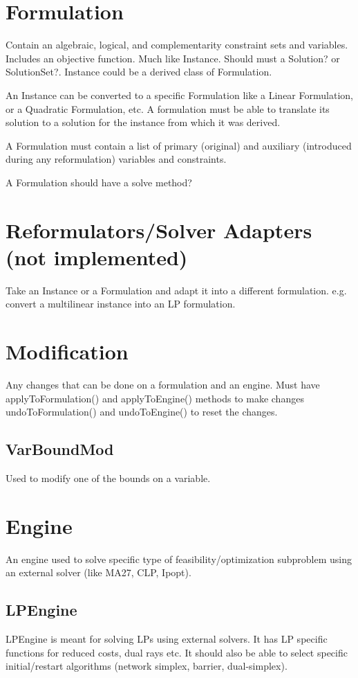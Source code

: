 \documentclass[10pt]{report}
\newcommand{\notimpl}[0]{(not implemented)}
\begin{document}
\section{Formulation}
Contain an algebraic, logical, and complementarity constraint sets and 
variables.  Includes an objective function. Much like Instance. Should must a
Solution? or SolutionSet?. Instance could be a derived class of Formulation.

An Instance can be converted to a specific Formulation like a Linear
Formulation, or a Quadratic Formulation, etc. A formulation must be able to
translate its solution to a solution for the instance from which it was derived.

A Formulation must contain a list of primary (original) and auxiliary
(introduced during any reformulation) variables and constraints.

A Formulation should have a solve method?

\section{Reformulators/Solver Adapters \notimpl}
Take an Instance or a Formulation and adapt it into a different formulation.
e.g. convert a multilinear instance into an LP formulation.

\section{Modification}
Any changes that can be done on a formulation and an engine. Must have
applyToFormulation() and applyToEngine() methods to make changes
undoToFormulation() and undoToEngine() to reset the changes. 
\subsection{VarBoundMod}
Used to modify one of the bounds on a variable.


\section{Engine}
An engine used to solve specific type of feasibility/optimization subproblem 
using an external solver (like MA27, CLP, Ipopt). 
\subsection{LPEngine}
LPEngine is meant for solving LPs using external solvers. It has LP
specific functions for reduced costs, dual rays etc. It should also be able to
select specific initial/restart algorithms (network simplex, barrier,
dual-simplex). 
\end{document}
